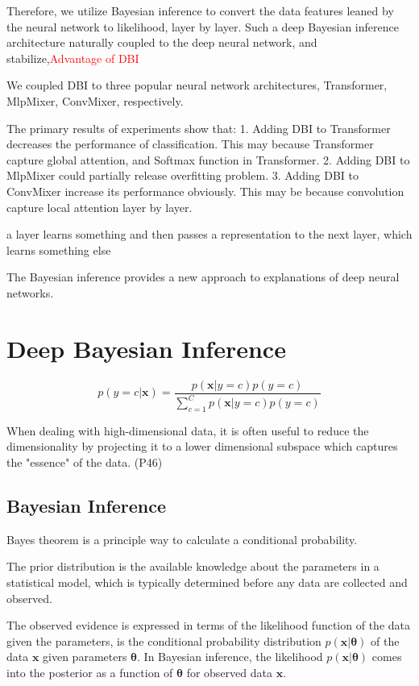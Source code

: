 \documentclass{article}
\begin{document}
Therefore, we utilize Bayesian inference to convert the data features leaned by the neural network to likelihood, layer by layer.
Such a deep Bayesian inference architecture naturally coupled to the deep neural network, and stabilize,\textcolor{red}{Advantage of DBI}

We coupled DBI to three popular neural network architectures, Transformer, MlpMixer, ConvMixer, respectively.

The primary results of experiments show that:
1. Adding DBI to Transformer decreases the performance of classification. This may because Transformer capture global attention, and Softmax function in Transformer.
2. Adding DBI to MlpMixer could partially release overfitting problem.
3. Adding DBI to ConvMixer increase its performance obviously. This may be because convolution capture local attention layer by layer.

a layer learns something and then passes a representation to the next layer, which learns something else


The Bayesian inference provides a new approach to explanations of deep neural networks.

\section{Deep Bayesian Inference}



\begin{equation}
  p(y=c|\bm{x}) = \frac{p(\bm{x}|y=c)p(y=c)}{\sum_{c=1}^C p(\bm{x}|y=c)p(y=c)}
\end{equation}


When dealing with high-dimensional data, it is often useful to reduce the dimensionality by projecting it to a lower dimensional subspace which captures the "essence" of the data. (P46)

\subsection{Bayesian Inference}

Bayes theorem is a principle way to calculate a conditional probability.

The prior distribution is the available knowledge about the parameters in a statistical model, which is typically determined before any data are collected and observed. 

The observed evidence is expressed in terms of the likelihood function of the data given the parameters, is the conditional probability distribution $p(\bm{x}|\bm{\theta})$ of  the data $\bm{x}$ given parameters $\bm{\theta}$. 
In Bayesian inference, the likelihood $p(\bm{x}|\bm{\theta})$ comes into the posterior as a function of $\bm{\theta}$ for observed data $\bm{x}$. \citep{van2021bayesian}
\end{document}
